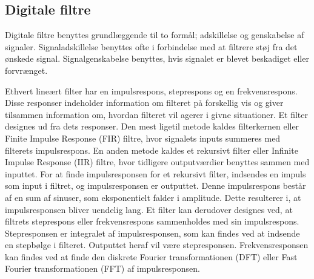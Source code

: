 \subsection{Digitale filtre}

Digitale filtre benyttes grundlæggende til to formål; adskillelse og genskabelse af signaler. Signaladskillelse %
benyttes ofte i forbindelse med at filtrere støj fra det ønskede signal. Signalgenskabelse benyttes, hvis signalet er blevet beskadiget eller forvrænget.  \citep{Smith1997}

Ethvert lineært filter har en impulsrespons, steprespons og en frekvensrespons. Disse responser indeholder information om filteret på forskellig vis og giver tilsammen information om, hvordan filteret vil agerer i givne situationer. \citep{Smith1997} Et filter designes ud fra dets responser. Den mest ligetil metode kaldes filterkernen eller Finite Impulse Response (FIR) filtre, hvor signalets inputs summeres med filterets impulsrespons. En anden metode kaldes et rekursivt filter eller Infinite Impulse Response (IIR) filtre, hvor tidligere outputværdier benyttes sammen med inputtet. For at finde impulsresponsen for et rekursivt filter, indsendes en impuls som input i filtret, og impulsresponsen er outputtet. Denne impulsrespons består af en sum af sinuser, som eksponentielt falder i amplitude. Dette resulterer i, at impulsresponsen bliver uendelig lang. \citep{Smith1997,Blandford2013} \newline
Et filter kan derudover designes ved, at filtrets steprespons eller frekvensrespons sammenholdes med sin impulsrespons. Stepresponsen er integralet af impulsresponsen, som kan findes ved at indsende en stepbølge i filteret. Outputtet heraf vil være stepresponsen. Frekvensresponsen kan findes ved at finde den diskrete Fourier transformationen (DFT) eller Fast Fourier transformationen (FFT) af impulsresponsen. \citep{Smith1997} %

